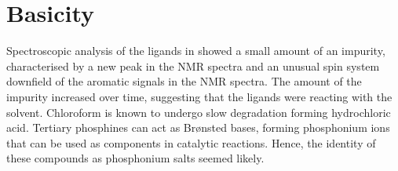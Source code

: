 


\section{Basicity}
\label{section:ligands:basicity}

Spectroscopic analysis of the \tBuxantphos{} ligands in  showed a small amount of an impurity, characterised by a new peak in the \phosphorus{} NMR spectra and an unusual spin system downfield of the aromatic signals in the \proton{} NMR spectra.  The amount of the impurity increased over time, suggesting that the ligands were reacting with the solvent.  Chloroform is known to undergo slow degradation forming hydrochloric acid.\cite{Yano1977}  Tertiary phosphines can act as Br\o nsted bases, forming phosphonium ions that can be used as components in catalytic reactions.\cite{Netherton2001}  Hence, the identity of these compounds as phosphonium salts seemed likely.


